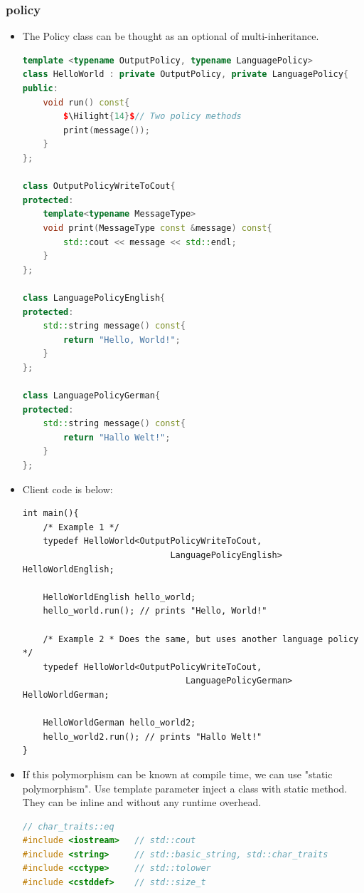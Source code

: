 \documentclass[a4paper,11pt,twoside]{book}
\newcommand{\Hilight}[1]{\makebox[0pt][l]{\color{yellow}\rule[-3pt]{#1em}{11pt}}}
\newcommand{\Hilight}[1]{}
\begin{document}
\subsubsection{policy}
\begin{itemize}
	
	\item The Policy class can be thought as an optional of multi-inheritance. 
	
\begin{lstlisting}[frame=single, language=c++]
template <typename OutputPolicy, typename LanguagePolicy>
class HelloWorld : private OutputPolicy, private LanguagePolicy{
public:
	void run() const{
		$\Hilight{14}$// Two policy methods
		print(message());
	}
};
	
class OutputPolicyWriteToCout{
protected:
	template<typename MessageType>
	void print(MessageType const &message) const{
		std::cout << message << std::endl;
	}
};
	
class LanguagePolicyEnglish{
protected:
	std::string message() const{
		return "Hello, World!";
	}
};
	
class LanguagePolicyGerman{
protected:
	std::string message() const{
		return "Hallo Welt!";
	}
};
\end{lstlisting}
\item Client code is below:
\begin{lstlisting}	
int main(){
	/* Example 1 */
	typedef HelloWorld<OutputPolicyWriteToCout, 
	                         LanguagePolicyEnglish> HelloWorldEnglish;
	
	HelloWorldEnglish hello_world;
	hello_world.run(); // prints "Hello, World!"
	
	/* Example 2 * Does the same, but uses another language policy */
	typedef HelloWorld<OutputPolicyWriteToCout, 
	                            LanguagePolicyGerman> HelloWorldGerman;
	
	HelloWorldGerman hello_world2;
	hello_world2.run(); // prints "Hallo Welt!"
}
\end{lstlisting}
	

		\item If this polymorphism can be known at compile time, we can use "static polymorphism". Use template parameter inject a class with static method. They can be inline and without any runtime overhead. 
\begin{lstlisting}[frame=single, language=c++]
// char_traits::eq
#include <iostream>   // std::cout
#include <string>     // std::basic_string, std::char_traits
#include <cctype>     // std::tolower
#include <cstddef>    // std::size_t
	

\end{lstlisting}
\end{itemize}
\end{document}
